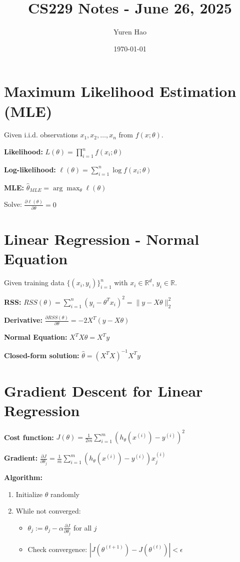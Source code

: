 \documentclass{article}
\title{CS229 Notes - June 26, 2025}
\author{Yuren Hao}
\date{\today}
\begin{document}
\maketitle

\section{Maximum Likelihood Estimation (MLE)}

Given i.i.d. observations $x_1, x_2, \ldots, x_n$ from $f(x; \theta)$.

\textbf{Likelihood:} $L(\theta) = \prod_{i=1}^{n} f(x_i; \theta)$

\textbf{Log-likelihood:} $\ell(\theta) = \sum_{i=1}^{n} \log f(x_i; \theta)$

\textbf{MLE:} $\hat{\theta}_{MLE} = \arg\max_{\theta} \ell(\theta)$

Solve: $\frac{\partial \ell(\theta)}{\partial \theta} = 0$

\section{Linear Regression - Normal Equation}

Given training data $\{(x_i, y_i)\}_{i=1}^n$ with $x_i \in \mathbb{R}^d$, $y_i \in \mathbb{R}$.

\textbf{RSS:} $RSS(\theta) = \sum_{i=1}^{n} (y_i - \theta^T x_i)^2 = \|y - X\theta\|_2^2$

\textbf{Derivative:} $\frac{\partial RSS(\theta)}{\partial \theta} = -2X^T(y - X\theta)$

\textbf{Normal Equation:} $X^TX\theta = X^Ty$

\textbf{Closed-form solution:} $\hat{\theta} = (X^TX)^{-1}X^Ty$

\section{Gradient Descent for Linear Regression}

\textbf{Cost function:} $J(\theta) = \frac{1}{2m}\sum_{i=1}^{m} (h_\theta(x^{(i)}) - y^{(i)})^2$

\textbf{Gradient:} $\frac{\partial J}{\partial \theta_j} = \frac{1}{m}\sum_{i=1}^{m} (h_\theta(x^{(i)}) - y^{(i)})x_j^{(i)}$

\textbf{Algorithm:}
\begin{enumerate}
    \item Initialize $\theta$ randomly
    \item While not converged:
    \begin{itemize}
        \item $\theta_j := \theta_j - \alpha \frac{\partial J}{\partial \theta_j}$ for all $j$
        \item Check convergence: $|J(\theta^{(t+1)}) - J(\theta^{(t)})| < \epsilon$
    \end{itemize}
\end{enumerate}
\end{document}
